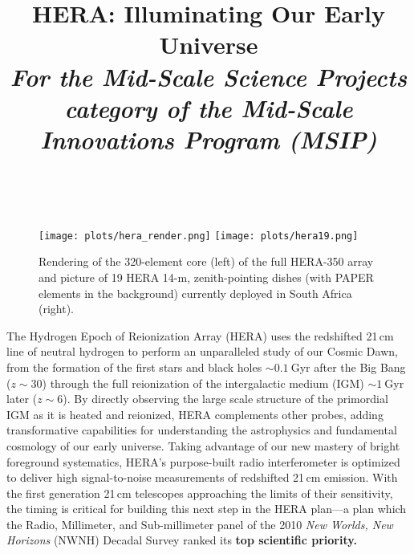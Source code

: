 \documentclass[preprint,11pt]{aastex}
\begin{document}

\title{HERA: Illuminating Our Early Universe\\
{\it For the Mid-Scale Science Projects category of the Mid-Scale Innovations Program (MSIP)}} 
\vspace{6pt}

{ \setlength{\parindent}{0cm}}



~
\begin{figure}[h!]
	\centering
	\vspace{-23pt}
	\texttt{[image: plots/hera\_render.png]}
	\texttt{[image: plots/hera19.png]}
	\vspace{-21pt}
	\caption{Rendering of the 320-element core (left) of the full HERA-350 array and picture of 19 HERA 14-m, zenith-pointing dishes (with PAPER elements in the background) currently deployed in South Africa (right).} 
	\label{fig:HERApictures}
	\vspace{-9pt}
\end{figure}

\noindent The Hydrogen Epoch of Reionization Array (HERA) uses the redshifted 21\,cm line
of neutral hydrogen to perform an unparalleled study of our Cosmic Dawn, from
the formation of the first stars and black holes $\sim0.1~$Gyr after the Big
Bang ($z\sim30$) through the full reionization of the intergalactic medium
(IGM) $\sim1~$Gyr later ($z\sim6$).  By directly observing the large scale
structure of the primordial IGM as it is heated and reionized, HERA complements
other probes, adding transformative capabilities for
understanding the astrophysics and fundamental cosmology of our early universe.
Taking advantage of our new mastery of bright foreground systematics, HERA's
purpose-built radio
interferometer is optimized to deliver high signal-to-noise measurements of
redshifted 21\,cm emission.
With the first generation 21\,cm telescopes approaching the limits of their sensitivity, the timing is critical 
for building this next step in the HERA plan---a plan which the 
Radio, Millimeter, and Sub-millimeter panel of the 2010 {\em New Worlds, New Horizons} (NWNH) Decadal Survey 
ranked its \textbf{top scientific priority.}
\end{document}
